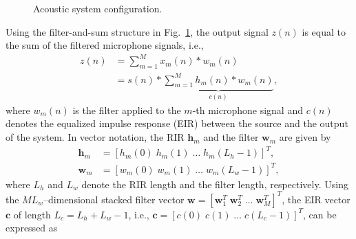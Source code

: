 \documentclass[10pt]{IEEEtran}
\begin{document}
\begin{figure}[t!]
  \caption{Acoustic system configuration.}
  \label{fig: ac_sys}
\end{figure}
Using the filter-and-sum structure in Fig.~\ref{fig: ac_sys}, the output signal $z(n)$ is equal to the sum of the filtered microphone signals, i.e.,
\begin{align}
  z(n) & = \sum_{m=1}^{M} x_m(n) \ast  w_m(n) \\
  \label{eq: outcomp}
  & = s(n) \ast \underbrace{\sum_{m=1}^{M} h_m(n) \ast  w_m(n)}_{c(n)},
\end{align}
where $w_m(n)$ is the filter applied to the $m$-th microphone signal and $c(n)$ denotes the equalized impulse response (EIR) between the source and the output of the system.
In vector notation, the RIR $\mathbf{h}_m$ and the filter $\mathbf{w}_m$ are given by 
\begin{align}
\mathbf{h}_m  & = [h_m(0) \; h_m(1) \; \ldots \; h_m(L_h-1)]^T, \\
\mathbf{w}_m  & = [w_m(0) \; w_m(1) \; \ldots \; w_m(L_w-1)]^T,
\end{align}
where $L_h$ and $L_w$ denote the RIR length and the filter length, respectively.
Using the $M L_w$--dimensional stacked filter vector $\mathbf{w} = [\mathbf{w}^T_1 \; \mathbf{w}^T_2 \; \ldots \; \mathbf{w}^T_M]^T$, the EIR vector $\mathbf{c}$ of length $L_c = L_h + L_w - 1$, i.e., $\mathbf{c} = [c(0) \; c(1) \; \ldots \; c(L_c-1)]^T$, can be expressed as~\cite{Miyoshi_ITASS_1988, Kodrasi_ITASLP_2013}
\end{document}
